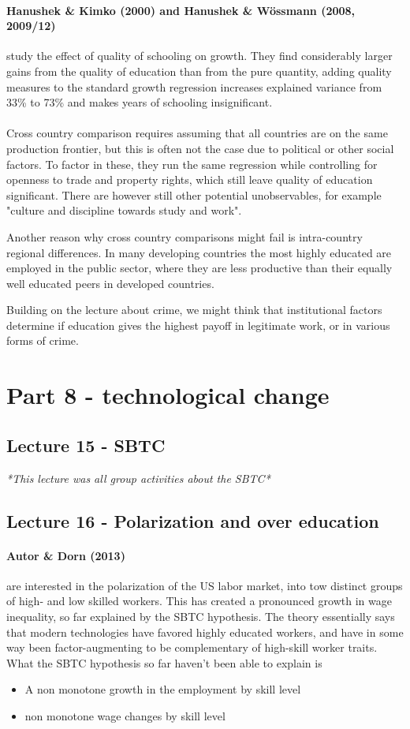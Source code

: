 \documentclass[12pt, a4paper]{article}
\begin{document}
\begin{multicols}{2}
\paragraph{Hanushek \& Kimko (2000) and Hanushek \& Wössmann (2008, 2009/12)} study the effect of quality of schooling on growth. They find considerably larger gains from the quality of education than from the pure quantity, adding quality measures to the standard growth regression increases explained variance from 33\% to 73\% and makes years of schooling insignificant.
\\ \\
Cross country comparison requires assuming that all countries are on the same production frontier, but this is often not the case due to political or other social factors. To factor in these, they run the same regression while controlling for openness to trade and property rights, which still leave quality of education significant. There are however still other potential unobservables, for example "culture and discipline towards study and work". 

Another reason why cross country comparisons might fail is intra-country regional differences. In many developing countries the most highly educated are employed in the public sector, where they are less productive than their equally well educated peers in developed countries. 

Building on the lecture about crime, we might think that institutional factors determine if education gives the highest payoff in legitimate work, or in various forms of crime.
\section{Part 8 - technological change}
\subsection{Lecture 15 - SBTC}
\textit{*This lecture was all group activities about the SBTC*}

\subsection{Lecture 16 - Polarization and over education}
\paragraph{Autor \& Dorn (2013)} are interested in the polarization of the US labor market, into tow distinct groups of high- and low skilled workers. This has created a pronounced growth in wage inequality, so far explained by the SBTC hypothesis. The theory essentially says that modern technologies have favored highly educated workers, and have in some way been factor-augmenting to be complementary of high-skill worker traits. What the SBTC hypothesis so far haven't been able to explain is 
\begin{itemize}
\item A non monotone growth in the employment by skill level
\item non monotone wage changes by skill level
\end{itemize}


\end{multicols}
\end{document}
